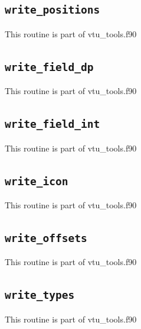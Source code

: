 \subsection{\tt write\_positions}
 This routine is part of vtu\_tools.f90
 \subsection{\tt write\_field\_dp}
 This routine is part of vtu\_tools.f90
 \subsection{\tt write\_field\_int}
 This routine is part of vtu\_tools.f90
 \subsection{\tt write\_icon}
 This routine is part of vtu\_tools.f90
 \subsection{\tt write\_offsets}
 This routine is part of vtu\_tools.f90
 \subsection{\tt write\_types}
 This routine is part of vtu\_tools.f90
